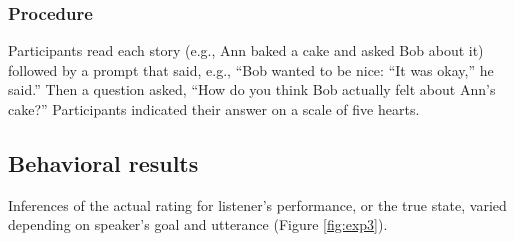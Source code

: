 \documentclass[10pt,letterpaper]{article}
\newcommand{\ndg}[1]{\textcolor{Green}{[ndg: #1]}}
\newcommand{\mht}[1]{\textcolor{DarkOrange}{[mht: #1]}}
\begin{document}
\subsubsection{Procedure}
Participants read each story (e.g., Ann baked a cake and asked Bob about it) followed by a prompt that said,
e.g., ``Bob wanted to be nice: ``It was okay,'' he said.''
Then a question asked, ``How do you think Bob actually felt about Ann's cake?''
Participants indicated their answer on a scale of five hearts.

\subsection{Behavioral results}



Inferences of the actual rating for listener's performance, or the true state, varied depending on speaker's goal and utterance (Figure \ref{fig:exp3}).

\end{document}
